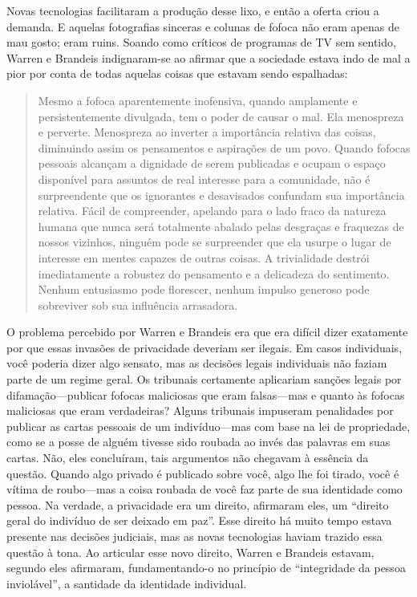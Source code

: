 \documentclass{book}
\begin{document}
Novas tecnologias facilitaram a produção desse lixo, e então a oferta criou a
demanda. E aquelas fotografias sinceras e colunas de fofoca não eram apenas de
mau gosto; eram ruins. Soando como críticos de programas de TV sem sentido,
Warren e Brandeis indignaram-se ao afirmar que a sociedade estava indo de mal a
pior por conta de todas aquelas coisas que estavam sendo espalhadas:

\begin{quote}
    Mesmo a fofoca aparentemente inofensiva, quando amplamente e persistentemente
    divulgada, tem o poder de causar o mal. Ela menospreza e perverte. Menospreza
    ao inverter a importância relativa das coisas, diminuindo assim os pensamentos
    e aspirações de um povo. Quando fofocas pessoais alcançam a dignidade de serem
    publicadas e ocupam o espaço disponível para assuntos de real interesse para a
    comunidade, não é surpreendente que os ignorantes e desavisados confundam sua
    importância relativa. Fácil de compreender, apelando para o lado fraco da
    natureza humana que nunca será totalmente abalado pelas desgraças e fraquezas de
    nossos vizinhos, ninguém pode se surpreender que ela usurpe o lugar de interesse
    em mentes capazes de outras coisas. A trivialidade destrói imediatamente a
    robustez do pensamento e a delicadeza do sentimento. Nenhum entusiasmo pode
    florescer, nenhum impulso generoso pode sobreviver sob sua influência arrasadora.
\end{quote}

O problema percebido por Warren e Brandeis era que era difícil dizer exatamente
por que essas invasões de privacidade deveriam ser ilegais. Em casos
individuais, você poderia dizer algo sensato, mas as decisões legais
individuais não faziam parte de um regime geral. Os tribunais certamente
aplicariam sanções legais por difamação---publicar fofocas maliciosas que eram
falsas---mas e quanto às fofocas maliciosas que eram verdadeiras? Alguns
tribunais impuseram penalidades por publicar as cartas pessoais de um
indivíduo---mas com base na lei de propriedade, como se a posse de alguém
tivesse sido roubada ao invés das palavras em suas cartas. Não, eles
concluíram, tais argumentos não chegavam à essência da questão. Quando algo
privado é publicado sobre você, algo lhe foi tirado, você é vítima de
roubo---mas a coisa roubada de você faz parte de sua identidade como pessoa. Na
verdade, a privacidade era um direito, afirmaram eles, um ``direito geral do
indivíduo de ser deixado em paz''. Esse direito há muito tempo estava presente
nas decisões judiciais, mas as novas tecnologias haviam trazido essa questão à
tona. Ao articular esse novo direito, Warren e Brandeis estavam, segundo eles
afirmaram, fundamentando-o no princípio de ``integridade da pessoa
inviolável'', a santidade da identidade individual.
\end{document}
